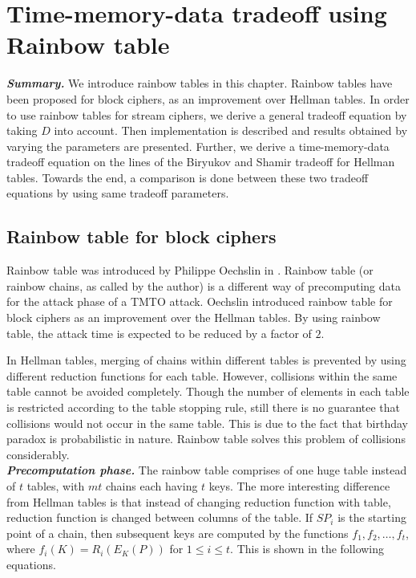 \chapter{Time-memory-data tradeoff using Rainbow table}
\label{chapter:tmdto-rainbow}

\indent \textbf{\textit{Summary.}} We introduce rainbow tables in this chapter. Rainbow tables have been proposed for block ciphers, as an improvement over Hellman tables. In order to use rainbow tables for stream ciphers, we derive a general tradeoff equation by taking $D$ into account. Then implementation is described and results obtained by varying the parameters are presented. Further, we derive a time-memory-data tradeoff equation on the lines of the Biryukov and Shamir tradeoff for Hellman tables. Towards the end, a comparison is done between these two tradeoff equations by using same tradeoff parameters.

\section{Rainbow table for block ciphers}
\label{sec:rainbow-block}

Rainbow table was introduced by Philippe Oechslin in \cite{oechslin:mfc}. Rainbow table (or rainbow chains, as called by the author) is a different way of precomputing data for the attack phase of a TMTO attack. Oechslin introduced rainbow table for block ciphers as an improvement over the Hellman tables. By using rainbow table, the attack time is expected to be reduced by a factor of $2$.

In Hellman tables, merging of chains within different tables is prevented by using different reduction functions for each table. However, collisions within the same table cannot be avoided completely. Though the number of elements in each table is restricted according to the table stopping rule, still there is no guarantee that collisions would not occur in the same table. This is due to the fact that birthday paradox is probabilistic in nature. Rainbow table solves this problem of collisions considerably.\\

\noindent \textit{\textbf{Precomputation phase.}} The rainbow table comprises of one huge table instead of $t$ tables, with $mt$ chains each having $t$ keys. The more interesting difference from Hellman tables is that instead of changing reduction function with table, reduction function is changed between columns of the table. If $SP_i$ is the starting point of a chain, then subsequent keys are computed by the functions \mbox{$f_1, f_2, \ldots, f_t$}, where $f_i(K) = R_i(E_{K}(P))$ for $1 \leq i \leq t$. This is shown in the following equations. 

